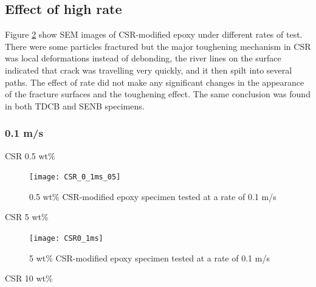 \documentclass[numbers=noendperiod,chapterprefix=on]{icldt} %
\begin{document}
{\subsection{Effect of high rate}
Figure \ref{CSR0_1ms} 
show SEM images of CSR-modified epoxy under different rates of test. There were some particles fractured but the major toughening mechanism in CSR was local deformations instead of debonding, the river lines on the surface indicated that crack was travelling very quickly, and it then spilt into several paths. The effect of rate did not make any significant changes in the appearance of the fracture surfaces and the toughening effect. The same conclusion was found in both TDCB and SENB specimens.

%

\subsubsection{0.1 m/s}

CSR 0.5 wt\%

\begin{figure}[!htpb]
\centering
\texttt{[image: CSR\_0\_1ms\_05]} 
\caption{0.5 wt\% CSR-modified epoxy specimen tested at a rate of 0.1 m/s} \label{CSR_0_1ms_05}
\end{figure}
\FloatBarrier

CSR 5 wt\%

\begin{figure}[!htpb]
\centering
\texttt{[image: CSR0\_1ms]} 
\caption{5 wt\% CSR-modified epoxy specimen tested at a rate of 0.1 m/s} \label{CSR0_1ms}
\end{figure}
\FloatBarrier

CSR 10 wt\%

}
\end{document}
